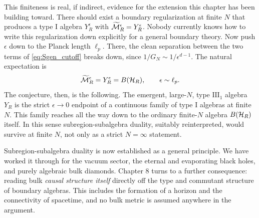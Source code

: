 This finiteness is real, if indirect, evidence for the extension this chapter has been building toward. There
should exist a boundary regularization at finite $N$ that produces a type I algebra $Y_R^\epsilon$ with
$\widetilde{\mathcal{M}}_R^\epsilon=Y_R^\epsilon$. Nobody currently knows how to write this regularization down explicitly
for a general boundary theory. Now push $\epsilon$ down to the Planck length $\ell_p$. There, the clean separation
between the two terms of \eqref{eq:Sgen_cutoff} breaks down, since $1/G_N\sim1/\epsilon^{d-1}$. The natural
expectation is
\[
\widetilde{\mathcal{M}}_R^\epsilon = Y_R^\epsilon = B(\mathcal{H}_R), \qquad \epsilon\sim\ell_p .
\]
The conjecture, then, is the following. The emergent, large-$N$, type $\mathrm{III}_1$ algebra $Y_R$ is the
strict $\epsilon\to0$ endpoint of a continuous family of type I algebras at finite $N$. This family reaches all
the way down to the ordinary finite-$N$ algebra $B(\mathcal{H}_R)$ itself. In this sense subregion-subalgebra duality,
suitably reinterpreted, would survive at finite $N$, not only as a strict $N=\infty$ statement.

\bigskip
\noindent Subregion-subalgebra duality is now established as a general principle. We have worked it through for
the vacuum sector, the eternal and evaporating black holes, and purely algebraic bulk diamonds. Chapter 8 turns
to a further consequence: reading bulk \emph{causal structure itself} directly off the type and commutant
structure of boundary algebras. This includes the formation of a horizon and the connectivity of spacetime, and
no bulk metric is assumed anywhere in the argument.
